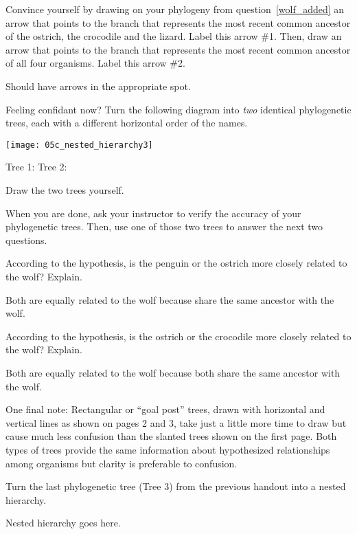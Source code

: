\documentclass[12pt, hidelinks]{exam}
\newcommand*\AnswerBox[2]{%
    \parbox[t][#1]{0.92\textwidth}{%
    \begin{solution}#2\end{solution}}
    \vspace{\stretch{1}}
}
\begin{document}
\begin{questions}
\setcounter{question}{7}

\question
Convince yourself by drawing on your phylogeny from question~\ref{wolf_added} an
arrow that points to the branch that represents the most recent common
ancestor of the ostrich, the crocodile and the lizard. Label this arrow
\#1. Then, draw an arrow that points to the branch that represents the
most recent common ancestor of all four organisms. Label this arrow \#2.

\AnswerBox{1\baselineskip}{Should have arrows in the appropriate spot.}

\question
Feeling confidant now? Turn the following diagram into
\emph{two} identical phylogenetic trees, each with a different
horizontal order of the names.

\end{questions}

\begin{center}
	\noindent\texttt{[image: 05c\_nested\_hierarchy3]}
\end{center}

Tree 1: \hspace*{0.4\textwidth}Tree 2:

\AnswerBox{3\baselineskip}{Draw the two trees yourself.}

\newpage

When you are done, ask your instructor to verify the accuracy of your phylogenetic
trees. Then, use one of those two trees to answer the next two
questions.

\begin{questions}
\setcounter{question}{9}

\question
According to the hypothesis, is the penguin or the ostrich
more closely related to the wolf? Explain.

\AnswerBox{3\baselineskip}{Both are equally related to the wolf because 
share the same ancestor with the wolf.}

\question
According to the hypothesis, is the ostrich or the
crocodile more closely related to the wolf? Explain.

\AnswerBox{3\baselineskip}{Both are equally related to the wolf because
both share the same ancestor with the wolf.}


One final note: Rectangular or “goal post” trees, drawn with horizontal and vertical
lines as shown on pages 2 and 3, take just a little more time to draw but
cause much less confusion than the slanted trees shown on the first page.
Both types of trees provide the same information about hypothesized
relationships among organisms but clarity is preferable to confusion.

\question[Checkout]
Turn the last phylogenetic tree (Tree 3) from the previous handout into a nested hierarchy.

\AnswerBox{10\baselineskip}{Nested hierarchy goes here.}

\end{questions}
\end{document}
